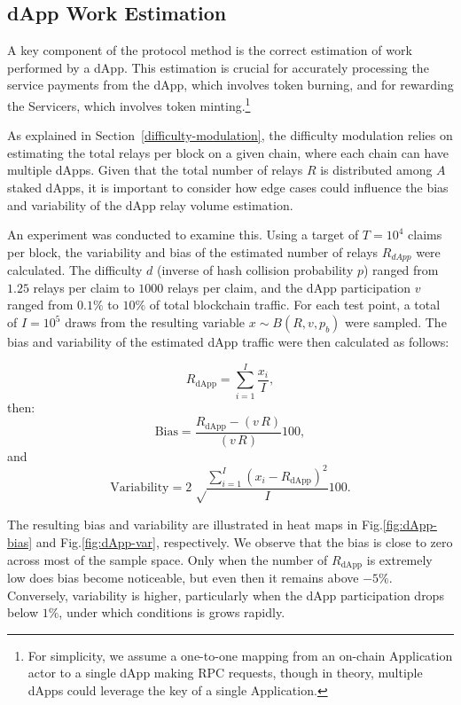\documentclass[runningheads]{llncs}
\begin{document}
\subsection{dApp Work Estimation}

A key component of the protocol method is the correct estimation of work performed by a dApp. This estimation is crucial for accurately processing the service payments from the dApp, which involves token burning, and for rewarding the Servicers, which involves token minting.\footnote{For simplicity, we assume a one-to-one mapping from an on-chain Application actor to a single dApp making RPC requests, though in theory, multiple dApps could leverage the key of a single Application.}

As explained in Section~\ref{difficulty-modulation}, the difficulty modulation relies on estimating the total relays per block on a given chain, where each chain can have multiple dApps. Given that the total number of relays $R$ is distributed among $A$ staked dApps, it is important to consider how edge cases could influence the bias and variability of the dApp relay volume estimation.

An experiment was conducted to examine this. Using a target of $T = 10^4$ claims per block, the variability and bias of the estimated number of relays $R_{dApp}$ were calculated. The difficulty $d$ (inverse of hash collision probability $p$) ranged from $1.25$ relays per claim to $1000$ relays per claim, and the dApp participation $v$ ranged from $0.1\%$ to $10\%$ of total blockchain traffic. For each test point, a total of $I=10^5$ draws from the resulting variable $x \sim B(R, v, p_b)$ were sampled. The bias and variability of the estimated dApp traffic were then calculated as follows:

\begin{equation}
    R_{\mbox{dApp}} = \sum_{i=1}^{I} \frac{x_i}{I},
\end{equation}
then:
\begin{equation}
    \label{equ:bias}
    \mbox{Bias} = \frac{R_{\mbox{dApp}} - (v\, R)}{(v\, R)} 100,
\end{equation}
and 
\begin{equation}
    \label{equ:var}
    \mbox{Variability} = 2 \, \sqrt\frac{\sum_{i=1}^{I}{(x_i-R_{\mbox{dApp}})^2}}{I} 100.
\end{equation}

The resulting bias and variability are illustrated in heat maps in Fig.\ref{fig:dApp-bias} and Fig.\ref{fig:dApp-var}, respectively. We observe that the bias is close to zero across most of the sample space. Only when the number of $R_{\mbox{dApp}}$ is extremely low does bias become noticeable, but even then it remains above $-5\%$. Conversely, variability is higher, particularly when the dApp participation drops below $1\%$, under which conditions is grows rapidly.
\end{document}

